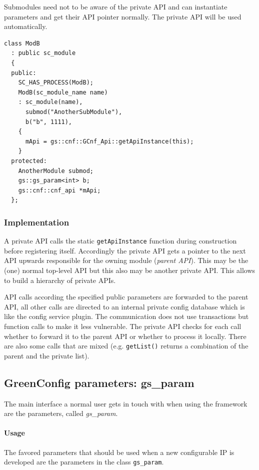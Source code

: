 \noindent
\begin{minipage}{\textwidth}
Submodules need not to be aware of the private API and can instantiate parameters and get their API pointer normally. The private API will be used automatically.

\begin{lstlisting}
class ModB
  : public sc_module
  {
  public:
    SC_HAS_PROCESS(ModB);
    ModB(sc_module_name name)
    : sc_module(name),
      submod("AnotherSubModule"),
      b("b", 1111),
    {
      mApi = gs::cnf::GCnf_Api::getApiInstance(this);
    }
  protected:
    AnotherModule submod;
    gs::gs_param<int> b;
    gs::cnf::cnf_api *mApi;
  };
\end{lstlisting}
\end{minipage}

\subsubsection{Implementation}
A private API calls the static \lstinline|getApiInstance| function during construction before registering itself. Accordingly the private API gets a pointer to the next API upwards responsible for the owning module ({\em parent API}). This may be the (one) normal top-level API but this also may be another private API. This allows to build a hierarchy of private APIs.

API calls according the specified public parameters are forwarded to the parent API, all other calls are directed to an internal private config database which is like the config service plugin. The communication does not use transactions but function calls to make it less vulnerable. The private API checks for each call whether to forward it to the parent API or whether to process it locally. There are also some calls that are mixed (e.g. \lstinline|getList()| returns a combination of the parent and the private list).


\subsection{GreenConfig parameters: gs\_param}
\label{GCnfGsParam}

The main interface a normal user gets in touch with when using the \GreenConfig framework are the \GreenConfig parameters, called {\em gs\_param}.

\paragraph{Usage}The favored parameters that should be used when a new configurable IP is developed are the \GreenConfig parameters in the class \lstinline|gs_param|.

